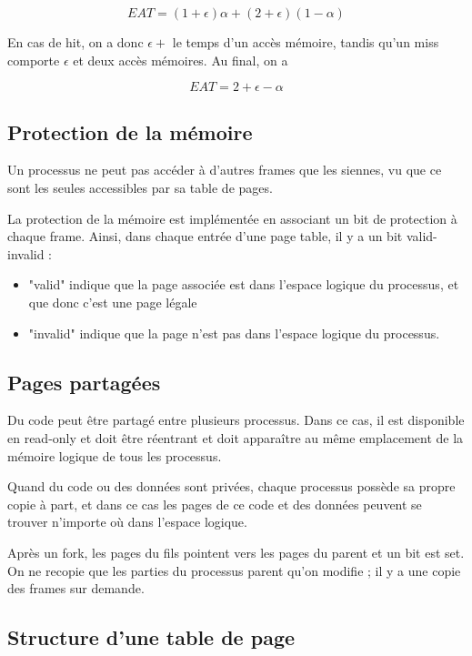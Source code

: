 	$$EAT = (1 + \epsilon) \alpha + (2 + \epsilon) (1 - \alpha)$$
	
	En cas de hit, on a donc $\epsilon +$ le temps d'un accès mémoire, tandis qu'un miss comporte $\epsilon$ et deux accès mémoires. Au final, on a
	
	$$EAT = 2 + \epsilon - \alpha$$
	
	\subsection{Protection de la mémoire}
	
	Un processus ne peut pas accéder à d'autres frames que les siennes, vu que ce sont les seules accessibles par sa table de pages.
	
	La protection de la mémoire est implémentée en associant un bit de protection à chaque frame. Ainsi, dans chaque entrée d'une page table, il y a un bit valid-invalid :
	
	\begin{itemize}
		\item "valid" indique que la page associée est dans l'espace logique du processus, et que donc c'est une page légale
		\item "invalid" indique que la page n'est pas dans l'espace logique du processus.
	\end{itemize}
	
	
	\subsection{Pages partagées}
	
	Du code peut être partagé entre plusieurs processus. Dans ce cas, il est disponible en read-only et doit être réentrant et doit apparaître au même emplacement de la mémoire logique de tous les processus.
	
	Quand du code ou des données sont privées, chaque processus possède sa propre copie à part, et dans ce cas les pages de ce code et des données peuvent se trouver n'importe où dans l'espace logique.
	
	Après un fork, les pages du fils pointent vers les pages du parent et un bit est set. On ne recopie que les parties du processus parent qu'on modifie ; il y a une copie des frames sur demande.
	
	
	\subsection{Structure d'une table de page}
	
